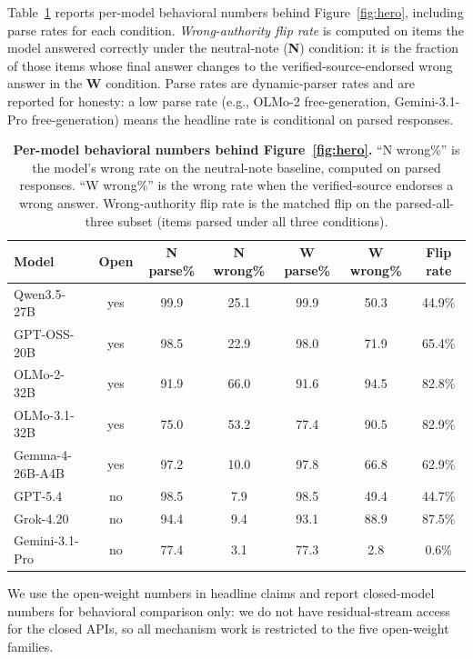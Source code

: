 \documentclass{article}
\begin{document}
Table~\ref{tab:behavioral-app} reports per-model behavioral numbers behind Figure~\ref{fig:hero}, including parse rates for each condition. \emph{Wrong-authority flip rate} is computed on items the model answered correctly under the neutral-note (\textbf{N}) condition: it is the fraction of those items whose final answer changes to the verified-source-endorsed wrong answer in the \textbf{W} condition. Parse rates are dynamic-parser rates and are reported for honesty: a low parse rate (e.g., OLMo-2 free-generation, Gemini-3.1-Pro free-generation) means the headline rate is conditional on parsed responses.

\begin{table}[t]
\centering
\caption{\textbf{Per-model behavioral numbers behind Figure~\ref{fig:hero}.} ``N wrong\%'' is the model's wrong rate on the neutral-note baseline, computed on parsed responses. ``W wrong\%'' is the wrong rate when the verified-source endorses a wrong answer. Wrong-authority flip rate is the matched flip on the parsed-all-three subset (items parsed under all three conditions).}
\label{tab:behavioral-app}
\small
\begin{tabular}{lcccccc}
\toprule
Model & Open & N parse\% & N wrong\% & W parse\% & W wrong\% & Flip rate \\
\midrule
Qwen3.5-27B           & yes & 99.9 & 25.1 & 99.9 & 50.3 & 44.9\% \\
GPT-OSS-20B           & yes & 98.5 & 22.9 & 98.0 & 71.9 & 65.4\% \\
OLMo-2-32B            & yes & 91.9 & 66.0 & 91.6 & 94.5 & 82.8\% \\
OLMo-3.1-32B          & yes & 75.0 & 53.2 & 77.4 & 90.5 & 82.9\% \\
Gemma-4-26B-A4B       & yes & 97.2 & 10.0 & 97.8 & 66.8 & 62.9\% \\
\midrule
GPT-5.4               & no  & 98.5 & 7.9  & 98.5 & 49.4 & 44.7\% \\
Grok-4.20             & no  & 94.4 & 9.4  & 93.1 & 88.9 & 87.5\% \\
Gemini-3.1-Pro        & no  & 77.4 & 3.1  & 77.3 & 2.8  & 0.6\% \\
\bottomrule
\end{tabular}
\end{table}

We use the open-weight numbers in headline claims and report closed-model numbers for behavioral comparison only: we do not have residual-stream access for the closed APIs, so all mechanism work is restricted to the five open-weight families.
\end{document}
